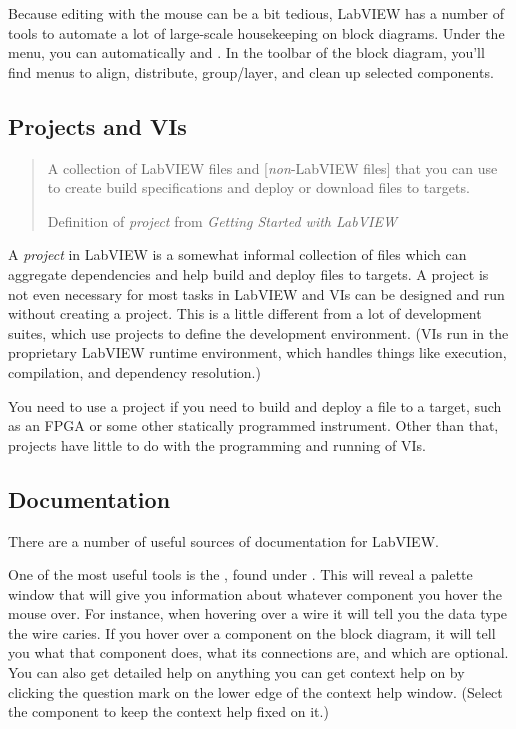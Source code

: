Because editing with the mouse can be a bit tedious, LabVIEW has a number of tools to automate a lot of large-scale housekeeping on block diagrams.  Under the  menu, you can automatically  and .  In the toolbar of the block diagram, you'll find menus to align, distribute, group/layer, and clean up selected components.

\subsection{Projects and VIs}
\label{sec:eq_labview:projects_vis}

\begin{quote}
  A collection of LabVIEW files and [\textit{non}-LabVIEW files] that
  you can use to create build specifications and deploy or download
  files to targets.
  \begin{flushright}\dashem Definition of \textit{project} from \textit{Getting Started with LabVIEW}\end{flushright}
\end{quote}

A \textit{project} in LabVIEW is a somewhat informal collection of files which can aggregate dependencies and help build and deploy files to targets.  A project is not even necessary for most tasks in LabVIEW and VIs can be designed and run without creating a project.  This is a little different from a lot of development suites, which use projects to define the development environment.  (VIs run in the proprietary LabVIEW runtime environment, which handles things like execution, compilation, and dependency resolution.)  

You need to use a project if you need to build and deploy a file to a target, such as an FPGA or some other statically programmed instrument.  Other than that, projects have little to do with the programming and running of VIs.


\subsection{Documentation}
\label{sec:eq_labview:docs}

There are a number of useful sources of documentation for LabVIEW.

One of the most useful tools is the , found under .  This will reveal a palette window that will give you information about whatever component you hover the mouse over.  For instance, when hovering over a wire it will tell you the data type the wire caries.  If you hover over a component on the block diagram, it will tell you what that component does, what its connections are, and which are optional.  You can also get detailed help on anything you can get context help on by clicking the question mark on the lower edge of the context help window.  (Select the component to keep the context help fixed on it.)


